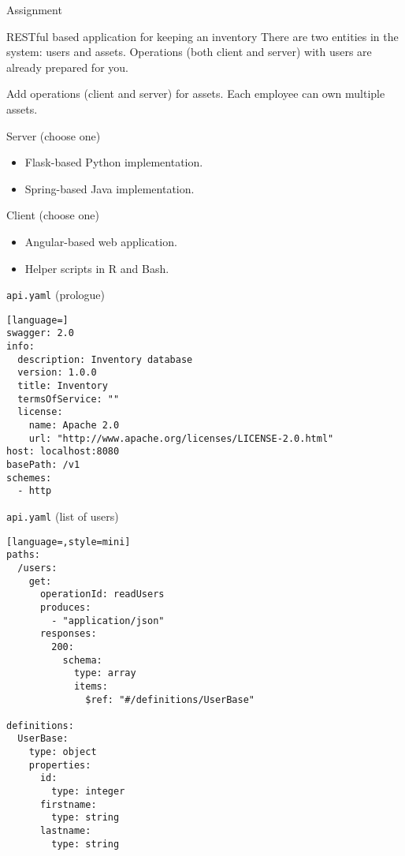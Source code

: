 \begin{frame}{Assignment}
    \begin{block}{RESTful based application for keeping an inventory}
        There are two entities in the system: users and assets.
        Operations (both client and server) with users are already
        prepared for you.
        
        \medskip
        
        Add operations (client and server) for assets.
        Each employee can own multiple assets.
    \end{block}

    \begin{block}{Server (choose one)}
        \begin{itemize}
            \item Flask-based Python implementation.
            \item Spring-based Java implementation.
        \end{itemize}
    \end{block}

    \begin{block}{Client (choose one)}
        \begin{itemize}
            \item Angular-based web application.
            \item Helper scripts in R and Bash.
        \end{itemize}
    \end{block}
\end{frame}


\begin{frame}[fragile]{\texttt{api.yaml} (prologue)}
\begin{lstlisting}[language=]
swagger: 2.0
info:
  description: Inventory database
  version: 1.0.0
  title: Inventory
  termsOfService: ""
  license:
    name: Apache 2.0
    url: "http://www.apache.org/licenses/LICENSE-2.0.html"
host: localhost:8080
basePath: /v1
schemes:
  - http
\end{lstlisting}
\end{frame}

\begin{frame}[fragile]{\texttt{api.yaml} (list of users)}
\begin{lstlisting}[language=,style=mini]
paths:
  /users:
    get:
      operationId: readUsers
      produces:
        - "application/json"
      responses:
        200:
          schema:
            type: array
            items:
              $ref: "#/definitions/UserBase"

definitions:
  UserBase:
    type: object
    properties:
      id:
        type: integer
      firstname:
        type: string
      lastname:
        type: string
\end{lstlisting}
\end{frame}

